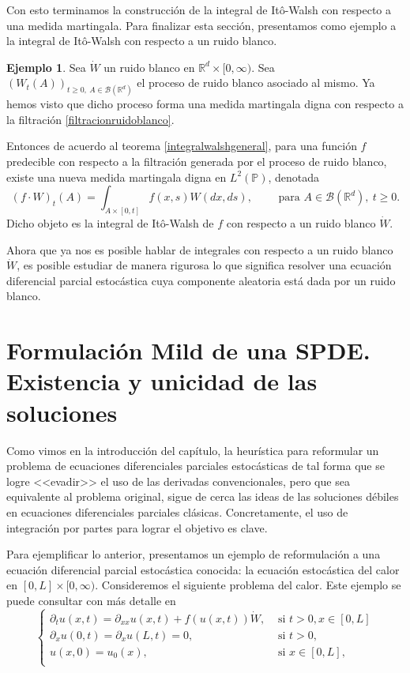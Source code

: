 \documentclass[letterpaper,twoside,12pt]{book}
\newcommand{\R}{\mathbb{R}}
\newcommand{\B}{\mathcal{B}}
\renewcommand{\P}{\mathbb{P}}
\newcommand{\W}{\dot{W}}
\newcommand{\1}{\mathds{1}}
\theoremstyle{definition}
\theoremstyle{definition}
\theoremstyle{remark}
\theoremstyle{definition}
\theoremstyle{definition}
\theoremstyle{definition}
\theoremstyle{definition}
\newtheorem{ejem}{Ejemplo}
\theoremstyle{definition}
\begin{document}
  Con esto terminamos la construcción de la integral de Itô-Walsh con respecto a una medida martingala. Para finalizar esta sección, presentamos como ejemplo a la integral de Itô-Walsh con respecto a un ruido blanco.
  \begin{ejem} 
   Sea $\dot W$ un ruido blanco en $\R^{d}\times [0,\infty)$. Sea $(W_t(A))_{t\geq0, \ A\in \B(\R^{d})}$ el proceso de ruido blanco asociado al mismo. Ya hemos visto que dicho proceso forma una medida martingala digna con respecto a la filtración \eqref{filtracionruidoblanco}. 

   Entonces de acuerdo al teorema \ref{integralwalshgeneral}, para una función $f$ predecible con respecto a la filtración generada por el proceso de ruido blanco, existe una nueva medida martingala digna en $L^2(\P)$, denotada 
   \[
   (f\cdot W)_t(A)=\int_{A\times [0,t]}f(x,s)W(dx,ds), \qquad \text{ para } A\in \B(\R^{d}), \ t\geq0.
   \]
   Dicho objeto es la integral de Itô-Walsh de $f$ con respecto a un ruido blanco $\dot W$.
   \end{ejem}
  
   Ahora que ya nos es posible hablar de integrales con respecto a un ruido blanco $\W$, es posible estudiar de manera rigurosa lo que significa resolver una  ecuación diferencial parcial estocástica cuya componente aleatoria está dada por un ruido blanco.

\section{Formulación Mild de una SPDE. Existencia y unicidad de las soluciones}
Como vimos en la introducción del capítulo, la heurística para reformular un problema de ecuaciones diferenciales parciales estocásticas de tal forma que se logre <<evadir>> el uso de las derivadas convencionales, pero que sea equivalente al problema original, sigue de cerca las ideas de las soluciones débiles en ecuaciones diferenciales parciales clásicas. Concretamente, el uso de integración por partes para lograr el objetivo es clave. 

Para ejemplificar lo anterior, presentamos un ejemplo de reformulación a una ecuación diferencial parcial estocástica conocida: la ecuación estocástica del calor en $[0,L]\times[0,\infty)$. Consideremos el siguiente problema del calor. Este ejemplo se puede consultar con más detalle en \cite[pp. 23 - 32]{Khoshnevisan2009}
\begin{equation}\label{calorejemplo}
   \begin{cases}
      \partial_tu(x,t)=\partial_{xx}u(x,t)+f(u(x,t))\W, & \text{ si } t>0, x\in [0,L]\\
      \partial_xu(0,t)=\partial_xu(L,t)=0, & \text{ si } t>0,\\
      u(x,0)=u_0(x), & \text{ si } x\in [0,L],\\
   \end{cases}
\end{equation}
\end{document}
